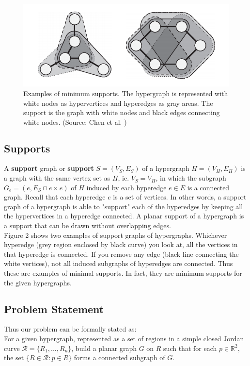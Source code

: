 \documentclass{NSF}
\begin{document}
\begin{figure}[ht]
\centering
\includegraphics[width=\textwidth]{optimal-hypergraphs}
\caption{Examples of minimum supports. The hypergraph is represented with white nodes as hypervertices and hyperedges as gray areas. The support is the graph with white nodes and black edges connecting white nodes. (Source: Chen et al. \cite{Chen2015}) }
\end{figure}


\subsection{Supports}
A \textbf{support} graph or \textbf{support} $S = (V_S, E_S)$ of a hypergraph $H = (V_H, E_H)$ is a graph with the same vertex set as $H$, ie. $V_S = V_H$, in which the subgraph $G_e = (e, E_S \cap e \times e)$ of $H$ induced by each hyperedge $e \in E$ is a connected graph. Recall that each hyperedge $e$ is a set of vertices. In other words, a support graph of a hypergraph is able to "support" each of the hyperedges by keeping all the hypervertices in a hyperedge connected.
A planar support of a hypergraph is a support that can be drawn without overlapping edges.\\

Figure 2 shows two examples of support graphs of hypergraphs. Whichever hyperedge (grey region enclosed by black curve) you look at, all the vertices in that hyperedge is connected. If you remove any edge (black line connecting the white vertices), not all induced subgraphs of hyperedges are connected. Thus these are examples of minimal supports. In fact, they are minimum supports for the given hypergraphs.


\subsection{Problem Statement}
Thus our problem can be formally stated as:\\
For a given hypergraph, represented as a set of regions in a simple closed Jordan curve $\mathcal{R} = \{ R_1, ... , R_n \}$, build a planar graph $G$ on $R$ such that for each $p \in \mathbb{R}^2$, the set $\{R \in \mathcal{R} : p \in R\}$ forms a connected subgraph of $G$. 
\end{document}
